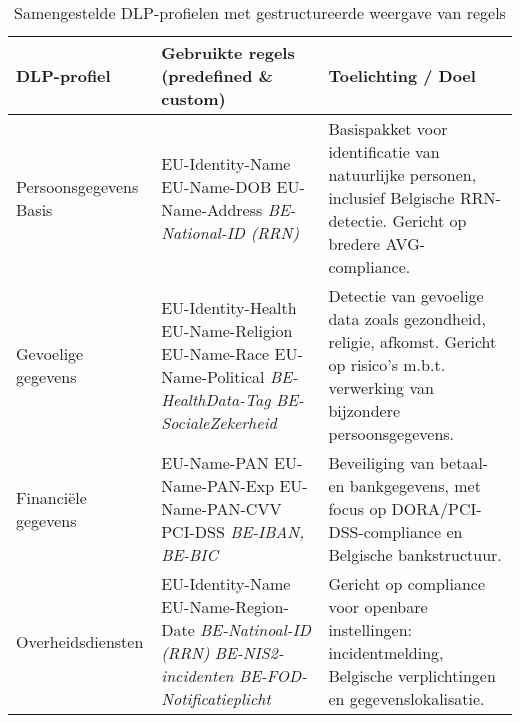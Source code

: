 \begin{table}[h]
    \centering
    \small
    \scriptsize
    \begin{tabular}{p{3cm}p{5cm}p{6cm}}
        \toprule
        \textbf{DLP-profiel} & \textbf{Gebruikte regels (predefined \& custom)} & \textbf{Toelichting / Doel} \\
        \midrule
        Persoonsgegevens Basis &
        EU-Identity-Name \newline
        EU-Name-DOB \newline
        EU-Name-Address \newline
        \textit{BE-National-ID (RRN)} &
        Basispakket voor identificatie van natuurlijke personen, inclusief Belgische RRN-detectie. Gericht op bredere AVG-compliance. \\
        
        Gevoelige gegevens &
        EU-Identity-Health \newline
        EU-Name-Religion \newline
        EU-Name-Race \newline
        EU-Name-Political \newline
        \textit{BE-HealthData-Tag} \newline
        \textit{BE-SocialeZekerheid} &
        Detectie van gevoelige data zoals gezondheid, religie, afkomst. Gericht op risico’s m.b.t. verwerking van bijzondere persoonsgegevens. \\
        
        Financiële gegevens &
        EU-Name-PAN \newline
        EU-Name-PAN-Exp \newline
        EU-Name-PAN-CVV \newline
        PCI-DSS \newline
        \textit{BE-IBAN, BE-BIC} &
        Beveiliging van betaal- en bankgegevens, met focus op DORA/PCI-DSS-compliance en Belgische bankstructuur. \\
        
        Overheidsdiensten &
        EU-Identity-Name \newline
        EU-Name-Region-Date \newline
        \textit{BE-Natinoal-ID (RRN)} \newline
        \textit{BE-NIS2-incidenten} \newline
        \textit{BE-FOD-Notificatieplicht} &
        Gericht op compliance voor openbare instellingen: incidentmelding, Belgische verplichtingen en gegevenslokalisatie. \\
        \bottomrule
    \end{tabular}
    \caption{Samengestelde DLP-profielen met gestructureerde weergave van regels}
    \label{tab:custom-dlp-profielen}
\end{table}


